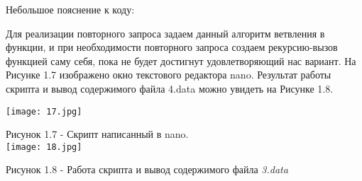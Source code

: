Небольшое пояснение к коду:

Для реализации повторного запроса задаем данный алгоритм ветвления в функции, и при необходимости повторного запроса создаем рекурсию-вызов функцией саму себя, пока не будет достигнут удовлетворяющий нас вариант. На Рисунке 1.7 изображено окно текстового редактора nano. Результат работы скрипта и вывод содержимого файла 4.data можно увидеть на Рисунке 1.8.

\vspace{0.5cm}
		\begin{center}
			\texttt{[image: 17.jpg]}

			Рисунок 1.7 - Скрипт написанный в nano.\\

			\texttt{[image: 18.jpg]}

			Рисунок 1.8 - Работа скрипта и вывод содержимого файла \textit{3.data}\\

		\end{center}
